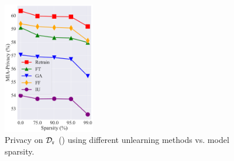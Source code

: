 
\begin{figure}
\centerline{
\includegraphics[width=40mm]{figs/privacy.pdf}
}
\vspace*{-1.5mm}
\caption{\footnotesize{Privacy on $\mathcal D_\mathrm{r}$ ({\MIAR}) using different unlearning methods vs. model sparsity.
}}
  \label{fig: results_privacy}
\vspace*{-6.5mm}
  
\end{figure}